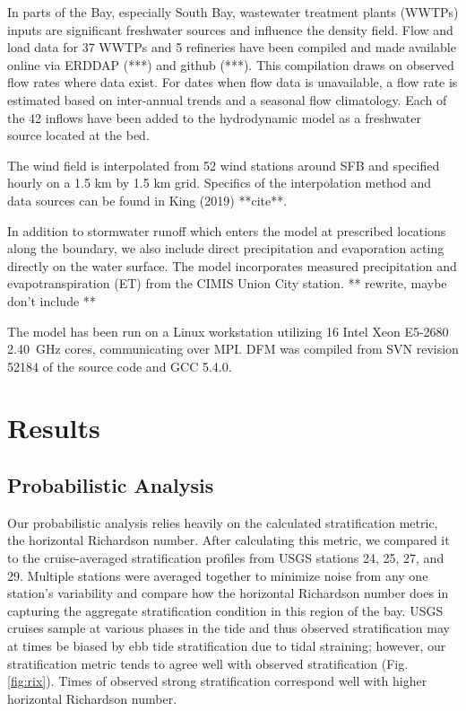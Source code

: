 \documentclass[preprint,review,12pt]{elsarticle}
\begin{document}
In parts of the Bay, especially South Bay, wastewater treatment plants (WWTPs) inputs are significant freshwater sources and influence the density field. Flow and load data for 37 WWTPs and 5 refineries have been compiled and made available online via ERDDAP (***) and github (***). This compilation draws on observed flow rates where data exist. For dates when flow data is unavailable, a flow rate is estimated based on inter-annual trends and a seasonal flow climatology. Each of the 42 inflows have been added to the hydrodynamic model as a freshwater source located at the bed.

The wind field is interpolated from 52 wind stations around SFB and specified hourly on a 1.5 km by 1.5 km grid. Specifics of the interpolation method and data sources can be found in King (2019) **cite**. 

In addition to stormwater runoff which enters the model at prescribed locations along the boundary, we also include direct precipitation and evaporation acting directly on the water surface. The model incorporates measured precipitation and evapotranspiration (ET\degree) from the CIMIS Union City station. ** rewrite, maybe don't include **

The model has been run on a Linux workstation utilizing 16 Intel Xeon E5-2680 2.40~GHz cores, communicating over MPI. DFM was compiled from SVN revision 52184 of the source code and GCC 5.4.0. 

\section{Results}\label{S:results}

\subsection{Probabilistic Analysis}
Our probabilistic analysis relies heavily on the calculated stratification metric, the horizontal Richardson number. After calculating this metric, we compared it to the cruise-averaged stratification profiles from USGS stations 24, 25, 27, and 29. Multiple stations were averaged together to minimize noise from any one station's variability and compare how the horizontal Richardson number does in capturing the aggregate stratification condition in this region of the bay. USGS cruises sample at various phases in the tide and thus observed stratification may at times be biased by ebb tide stratification due to tidal straining; however, our stratification metric tends to agree well with observed stratification (Fig. \ref{fig:rix}). Times of observed strong stratification correspond well with higher horizontal Richardson number.  
\end{document}
